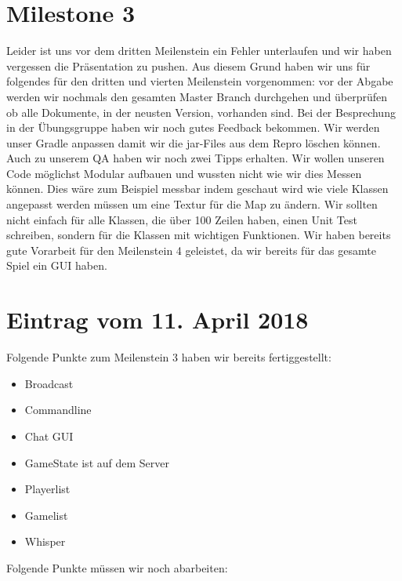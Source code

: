 \documentclass{scrartcl}
\newcommand{\n}{\newline}
\begin{document}
\section*{Milestone 3}
Leider ist uns vor dem dritten Meilenstein ein Fehler unterlaufen und wir haben vergessen die Präsentation zu pushen. Aus diesem Grund haben wir uns für folgendes für den dritten und vierten Meilenstein vorgenommen: vor der Abgabe werden wir nochmals den gesamten Master Branch durchgehen und überprüfen ob alle Dokumente, in der neusten Version, vorhanden sind. Bei der Besprechung in der Übungsgruppe haben wir noch gutes Feedback bekommen. Wir werden unser Gradle anpassen damit wir die jar-Files aus dem Repro löschen können. Auch zu unserem QA haben wir noch zwei Tipps erhalten. Wir wollen unseren Code möglichst Modular aufbauen und wussten nicht wie wir dies Messen können. Dies wäre zum Beispiel messbar indem geschaut wird wie viele Klassen angepasst werden müssen um eine Textur für die Map zu ändern. Wir sollten nicht einfach für alle Klassen, die über 100 Zeilen haben, einen Unit Test schreiben, sondern für die Klassen mit wichtigen Funktionen. Wir haben bereits gute Vorarbeit für den Meilenstein 4 geleistet, da wir bereits für das gesamte Spiel ein GUI haben. 

\section*{Eintrag vom 11. April 2018}
Folgende Punkte zum Meilenstein 3 haben wir bereits fertiggestellt:
\begin{itemize}
	\item Broadcast \n
	\item Commandline \n
	\item Chat GUI \n
	\item GameState ist auf dem Server \n
	\item Playerlist \n
	\item Gamelist \n
	\item Whisper \n	
\end{itemize}	
Folgende Punkte müssen wir noch abarbeiten:
\end{document}
